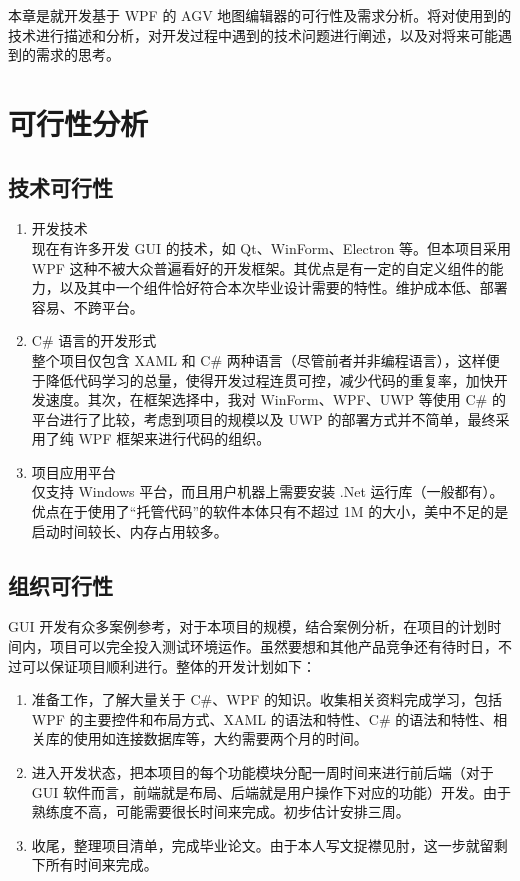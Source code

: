 
本章是就开发基于 WPF 的 AGV 地图编辑器的可行性及需求分析。将对使用到的技术进行描述和分析，对开发过程中遇到的技术问题进行阐述，以及对将来可能遇到的需求的思考。

\section{可行性分析}

\subsection{技术可行性}

\begin{enumerate}
  \item 开发技术\\
        现在有许多开发 GUI 的技术，如 Qt、WinForm、Electron 等。但本项目采用 WPF 这种不被大众普遍看好的开发框架。其优点是有一定的自定义组件的能力，以及其中一个组件恰好符合本次毕业设计需要的特性。维护成本低、部署容易、不跨平台。
  \item C\# 语言的开发形式\\
        整个项目仅包含 XAML 和 C\# 两种语言（尽管前者并非编程语言），这样便于降低代码学习的总量，使得开发过程连贯可控，减少代码的重复率，加快开发速度。其次，在框架选择中，我对 WinForm、WPF、UWP 等使用 C\# 的平台进行了比较，考虑到项目的规模以及 UWP 的部署方式并不简单，最终采用了纯 WPF 框架来进行代码的组织。
  \item 项目应用平台\\
        仅支持 Windows 平台，而且用户机器上需要安装 .Net 运行库（一般都有）。优点在于使用了``托管代码''的软件本体只有不超过 1M 的大小，美中不足的是启动时间较长、内存占用较多。
\end{enumerate}

\subsection{组织可行性}

GUI 开发有众多案例参考，对于本项目的规模，结合案例分析，在项目的计划时间内，项目可以完全投入测试环境运作。虽然要想和其他产品竞争还有待时日，不过可以保证项目顺利进行。整体的开发计划如下：

\begin{enumerate}
  \item 准备工作，了解大量关于 C\#、WPF 的知识。收集相关资料完成学习，包括 WPF 的主要控件和布局方式、XAML 的语法和特性、C\# 的语法和特性、相关库的使用如连接数据库等，大约需要两个月的时间。
  \item 进入开发状态，把本项目的每个功能模块分配一周时间来进行前后端（对于 GUI 软件而言，前端就是布局、后端就是用户操作下对应的功能）开发。由于熟练度不高，可能需要很长时间来完成。初步估计安排三周。
  \item 收尾，整理项目清单，完成毕业论文。由于本人写文捉襟见肘，这一步就留剩下所有时间来完成。
\end{enumerate}

